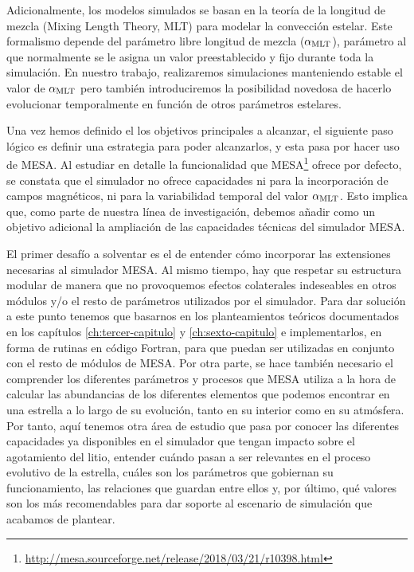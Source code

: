 Adicionalmente, los modelos simulados se basan en la teoría de la longitud de mezcla (Mixing Length Theory, MLT) para modelar la convección estelar. Este formalismo depende del parámetro libre longitud de mezcla ($\alpha_{\mathrm{MLT}}$), parámetro al que normalmente se le asigna un valor preestablecido y fijo durante toda la simulación. En nuestro trabajo, realizaremos simulaciones manteniendo estable el valor de $\alpha_{\mathrm{MLT}}$ pero también introduciremos la posibilidad novedosa de hacerlo evolucionar temporalmente en función de otros parámetros estelares.\par

Una vez hemos definido el los objetivos principales a alcanzar, el siguiente paso lógico es definir una estrategia para poder alcanzarlos, y esta pasa por hacer uso de MESA. Al estudiar en detalle la funcionalidad que MESA\footnote{\url{http://mesa.sourceforge.net/release/2018/03/21/r10398.html}} ofrece por defecto, se constata que el simulador no ofrece capacidades ni para la incorporación de campos magnéticos, ni para la variabilidad temporal del valor $\alpha_{\mathrm{MLT}}$. Esto implica que, como parte de nuestra línea de investigación, debemos añadir como un objetivo adicional la ampliación de las capacidades técnicas del simulador MESA.\par

El primer desafío a solventar es el de entender cómo incorporar las extensiones necesarias al simulador MESA. Al mismo tiempo, hay que respetar su estructura modular de manera que no provoquemos efectos colaterales indeseables en otros módulos y/o el resto de parámetros utilizados por el simulador. Para dar solución a este punto tenemos que basarnos en los planteamientos teóricos documentados en los capítulos \ref{ch:tercer-capitulo} y \ref{ch:sexto-capitulo} e implementarlos, en forma de rutinas en código Fortran, para que puedan ser utilizadas en conjunto con el resto de módulos de MESA. Por otra parte, se hace también necesario el comprender los diferentes parámetros y procesos que MESA utiliza a la hora de calcular las abundancias de los diferentes elementos que podemos encontrar en una estrella a lo largo de su evolución, tanto en su interior como en su atmósfera. Por tanto, aquí tenemos otra área de estudio que pasa por conocer las diferentes capacidades ya disponibles en el simulador que tengan impacto sobre el agotamiento del litio, entender cuándo pasan a ser relevantes en el proceso evolutivo de la estrella, cuáles son los parámetros que gobiernan su funcionamiento, las relaciones que guardan entre ellos y, por último, qué valores son los más recomendables para dar soporte al escenario de simulación que acabamos de plantear.\par

